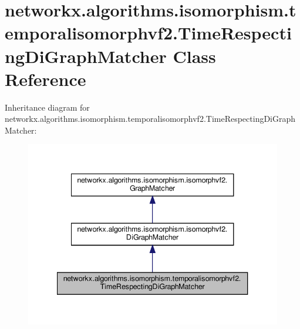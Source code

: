 \hypertarget{classnetworkx_1_1algorithms_1_1isomorphism_1_1temporalisomorphvf2_1_1TimeRespectingDiGraphMatcher}{}\section{networkx.\+algorithms.\+isomorphism.\+temporalisomorphvf2.\+Time\+Respecting\+Di\+Graph\+Matcher Class Reference}
\label{classnetworkx_1_1algorithms_1_1isomorphism_1_1temporalisomorphvf2_1_1TimeRespectingDiGraphMatcher}


Inheritance diagram for networkx.\+algorithms.\+isomorphism.\+temporalisomorphvf2.\+Time\+Respecting\+Di\+Graph\+Matcher\+:
\nopagebreak
\begin{figure}[H]
\begin{center}
\leavevmode
\includegraphics[width=340pt]{classnetworkx_1_1algorithms_1_1isomorphism_1_1temporalisomorphvf2_1_1TimeRespectingDiGraphMatcher__inherit__graph}
\end{center}
\end{figure}


